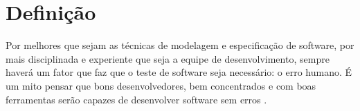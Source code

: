 \documentclass[
	12pt,				%
	openright,			%
	oneside,			%
	a4paper,			%
	english,			%
	brazil,				%
	]{abntex2}
\begin{document}
\section{Definição}

\begin{citacao}
Por melhores que sejam as técnicas de modelagem e especificação de software, por mais disciplinada e experiente que seja a equipe de desenvolvimento, sempre haverá um fator que faz que o teste de software seja necessário: o erro humano. É um mito pensar que bons desenvolvedores, bem concentrados e com boas ferramentas serão capazes de desenvolver software sem erros . %
\end{citacao}








\end{document}
